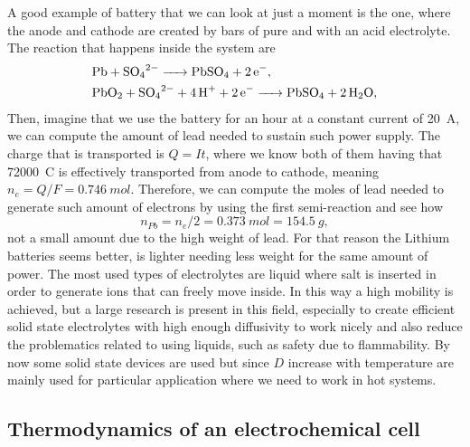 {
    A good example of battery that we can look at just a moment is the  one, where the anode and cathode are created by bars of pure  and  with an acid electrolyte. The reaction that happens inside the system are
    \begin{align*}
        &\ce{Pb + SO_4^{2-} -> PbSO_4 + 2e^{-}},\\ 
        &\ce{PbO_2 + SO_4^{2-} + 4H^+ + 2e^{-} -> PbSO_4 + 2H_2O},
    \end{align*}
    Then, imagine that we use the battery for an hour at a constant current of \SI{20}{A}, we can compute the amount of lead needed to sustain such power supply. The charge that is transported is $Q = It$, where we know both of them having that \SI{72000}{C} is effectively transported from anode to cathode, meaning $n_e = Q/F = \SI{0.746}{mol}$. Therefore, we can compute the moles of lead needed to generate such amount of electrons by using the first semi-reaction and see how
    \begin{displaymath}
        n_{Pb} = n_e/2 = \SI{0.373}{mol} = \SI{154.5}{g},
    \end{displaymath} 
    not a small amount due to the high weight of lead. For that reason the Lithium batteries seems better,  is lighter needing less weight for the same amount of power.
}
\nt
{
    The most used types of electrolytes are liquid where salt is inserted in order to generate ions that can freely move inside. In this way a high mobility is achieved, but a large research is present in this field, especially to create efficient solid state electrolytes with high enough diffusivity to work nicely and also reduce the problematics related to using liquids, such as safety due to flammability. By now some solid state devices are used but since $D$ increase with temperature are mainly used for particular application where we need to work in hot systems.
}

\subsection{Thermodynamics of an electrochemical cell}

